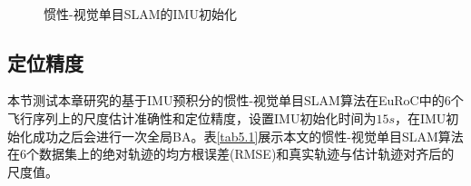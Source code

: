 \begin{figure}[h]
{          }\\
     \caption{惯性-视觉单目SLAM的IMU初始化}
\label{fig5.3}
\end{figure}        
          

\subsection{定位精度}
本节测试本章研究的基于IMU预积分的惯性-视觉单目SLAM算法在EuRoC中的6个飞行序列上的尺度估计准确性和定位精度，设置IMU初始化时间为$15s$，在IMU初始化成功之后会进行一次全局BA。表\ref{tab5.1}展示本文的惯性-视觉单目SLAM算法在6个数据集上的绝对轨迹的均方根误差(RMSE)和真实轨迹与估计轨迹对齐后的尺度值。

